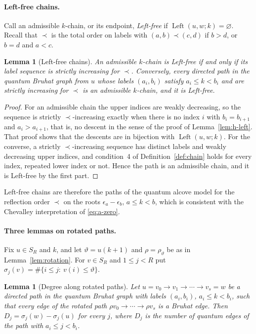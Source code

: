 \documentclass[11pt]{article}
\newtheorem{lemma}[proposition]{Lemma}
\newcommand{\Left}{\operatorname{Left}}
\begin{document}
\paragraph{Left-free chains.}
Call an admissible $k$-chain, or its endpoint, \emph{Left-free} if
$\Left(u,w;k)=\varnothing$. Recall that $\prec$ is the total order on
labels with $(a,b)\prec(c,d)$ if $b>d$, or $b=d$ and $a<c$.

\begin{lemma}[Left-free chains]\label{lem:left-free}
An admissible $k$-chain is Left-free if and only if its label sequence
is strictly increasing for $\prec$. Conversely, every directed path in
the quantum Bruhat graph from $u$ whose labels $(a_i,b_i)$ satisfy
$a_i\leq k<b_i$ and are strictly increasing for $\prec$ is an
admissible $k$-chain, and it is Left-free.
\end{lemma}

\begin{proof}
For an admissible chain the upper indices are weakly decreasing, so
the sequence is strictly $\prec$-increasing exactly when there is no
index $i$ with $b_i=b_{i+1}$ and $a_i>a_{i+1}$, that is, no descent in
the sense of the proof of Lemma~\ref{lem:h-left}. That proof shows
that the descents are in bijection with $\Left(u,w;k)$. For the
converse, a strictly $\prec$-increasing sequence has distinct labels
and weakly decreasing upper indices, and condition~4 of
Definition~\ref{def:chain} holds for every index, repeated lower index
or not. Hence the path is an admissible chain, and it is Left-free by
the first part.
\end{proof}

Left-free chains are therefore the paths of the quantum alcove model
for the reflection order $\prec$ on the roots $\epsilon_a-\epsilon_b$,
$a\leq k<b$, which is consistent with the Chevalley interpretation of
\eqref{eq:a-zero}.

\paragraph{Three lemmas on rotated paths.}
Fix $u\in S_R$ and $k$, and let $\vartheta=u(k+1)$ and
$\rho=\rho_\vartheta$ be as in Lemma~\ref{lem:rotation}. For
$v\in S_R$ and $1\leq j<R$ put
$\sigma_j(v)=\#\{i\leq j:\ v(i)\leq\vartheta\}$.

\begin{lemma}[Degree along rotated paths]\label{lem:sigma}
Let $u=v_0\to v_1\to\cdots\to v_s=w$ be a directed path in the quantum
Bruhat graph with labels $(a_i,b_i)$, $a_i\leq k<b_i$, such that every
edge of the rotated path $\rho v_0\to\cdots\to\rho v_s$ is a Bruhat
edge. Then $D_j=\sigma_j(w)-\sigma_j(u)$ for every $j$, where $D_j$ is
the number of quantum edges of the path with $a_i\leq j<b_i$.
\end{lemma}
\end{document}
